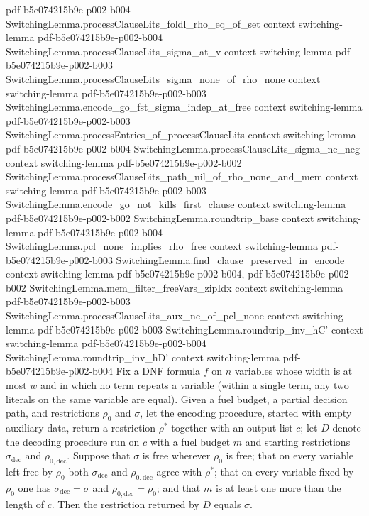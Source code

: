 \begin{lemma}
  {pdf-b5e074215b9e-p002-b004}
\proofstep
  {SwitchingLemma.processClauseLits_foldl_rho_eq_of_set}
  {context}
  {switching-lemma}
  {pdf-b5e074215b9e-p002-b004}
\proofstep
  {SwitchingLemma.processClauseLits_sigma_at_v}
  {context}
  {switching-lemma}
  {pdf-b5e074215b9e-p002-b003}
\proofstep
  {SwitchingLemma.processClauseLits_sigma_none_of_rho_none}
  {context}
  {switching-lemma}
  {pdf-b5e074215b9e-p002-b003}
\proofstep
  {SwitchingLemma.encode_go_fst_sigma_indep_at_free}
  {context}
  {switching-lemma}
  {pdf-b5e074215b9e-p002-b003}
\proofstep
  {SwitchingLemma.processEntries_of_processClauseLits}
  {context}
  {switching-lemma}
  {pdf-b5e074215b9e-p002-b004}
\proofstep
  {SwitchingLemma.processClauseLits_sigma_ne_neg}
  {context}
  {switching-lemma}
  {pdf-b5e074215b9e-p002-b002}
\proofstep
  {SwitchingLemma.processClauseLits_path_nil_of_rho_none_and_mem}
  {context}
  {switching-lemma}
  {pdf-b5e074215b9e-p002-b003}
\proofstep
  {SwitchingLemma.encode_go_not_kills_first_clause}
  {context}
  {switching-lemma}
  {pdf-b5e074215b9e-p002-b002}
\proofstep
  {SwitchingLemma.roundtrip_base}
  {context}
  {switching-lemma}
  {pdf-b5e074215b9e-p002-b004}
\proofstep
  {SwitchingLemma.pcl_none_implies_rho_free}
  {context}
  {switching-lemma}
  {pdf-b5e074215b9e-p002-b003}
\proofstep
  {SwitchingLemma.find_clause_preserved_in_encode}
  {context}
  {switching-lemma}
  {pdf-b5e074215b9e-p002-b004,
    pdf-b5e074215b9e-p002-b002}
\proofstep
  {SwitchingLemma.mem_filter_freeVars_zipIdx}
  {context}
  {switching-lemma}
  {pdf-b5e074215b9e-p002-b003}
\proofstep
  {SwitchingLemma.processClauseLits_aux_ne_of_pcl_none}
  {context}
  {switching-lemma}
  {pdf-b5e074215b9e-p002-b003}
\proofstep
  {SwitchingLemma.roundtrip_inv_hC'}
  {context}
  {switching-lemma}
  {pdf-b5e074215b9e-p002-b004}
\proofstep
  {SwitchingLemma.roundtrip_inv_hD'}
  {context}
  {switching-lemma}
  {pdf-b5e074215b9e-p002-b004}
Fix a DNF formula $f$ on $n$ variables whose width is at most $w$ and in which no term
repeats a variable (within a single term, any two literals on the same variable are
equal). Given a fuel budget, a partial decision path, and restrictions $\rho_0$ and
$\sigma$, let the encoding procedure, started with empty auxiliary data, return a
restriction $\rho^\ast$ together with an output list $c$; let $D$ denote the decoding
procedure run on $c$ with a fuel budget $m$ and starting restrictions
$\sigma_{\mathrm{dec}}$ and $\rho_{0,\mathrm{dec}}$. Suppose that $\sigma$ is free
wherever $\rho_0$ is free; that on every variable left free by $\rho_0$ both
$\sigma_{\mathrm{dec}}$ and $\rho_{0,\mathrm{dec}}$ agree with $\rho^\ast$; that on
every variable fixed by $\rho_0$ one has $\sigma_{\mathrm{dec}} = \sigma$ and
$\rho_{0,\mathrm{dec}} = \rho_0$; and that $m$ is at least one more than the length of
$c$. Then the restriction returned by $D$ equals $\sigma$.
\end{lemma}

